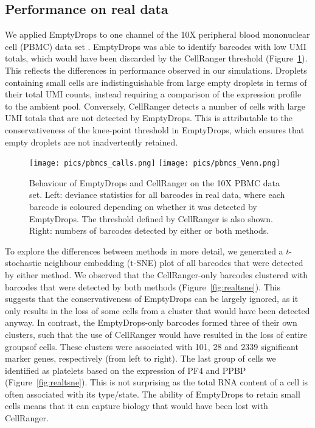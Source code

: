 \documentclass[10pt,letterpaper]{article}
\begin{document}
\subsection*{Performance on real data}
We applied EmptyDrops to one channel of the 10X peripheral blood mononuclear cell (PBMC) data set \cite{zheng2017massively}.
EmptyDrops was able to identify barcodes with low UMI totals, which would have been discarded by the CellRanger threshold (Figure~\ref{fig:realcall}). 
This reflects the differences in performance observed in our simulations.
Droplets containing small cells are indistinguishable from large empty droplets in terms of their total UMI counts, instead requiring a comparison of the expression profile to the ambient pool.
Conversely, CellRanger detects a number of cells with large UMI totals that are not detected by EmptyDrops.
This is attributable to the conservativeness of the knee-point threshold in EmptyDrops, which ensures that empty droplets are not inadvertently retained.

\begin{figure}[bt]
    \begin{center}
        \texttt{[image: pics/pbmcs\_calls.png]}
        \texttt{[image: pics/pbmcs\_Venn.png]}
    \end{center}
    \caption{Behaviour of EmptyDrops and CellRanger on the 10X PBMC data set.
        Left: deviance statistics for all barcodes in real data, where each barcode is coloured depending on whether it was detected by EmptyDrops.
        The threshold defined by CellRanger is also shown.
        Right: numbers of barcodes detected by either or both methods.
    }
    \label{fig:realcall}
\end{figure}

To explore the differences between methods in more detail, we generated a $t$-stochastic neighbour embedding (t-SNE) plot \cite{van2008visualizing} of all barcodes that were detected by either method.
We observed that the CellRanger-only barcodes clustered with barcodes that were detected by both methods (Figure~\ref{fig:realtsne}).
This suggests that the conservativeness of EmptyDrops can be largely ignored, as it only results in the loss of some cells from a cluster that would have been detected anyway.
In contrast, the EmptyDrops-only barcodes formed three of their own clusters, such that the use of CellRanger would have resulted in the loss of entire groupsof cells. 
These clusters were associated with 101, 28 and 2339 significant marker genes, respectively (from left to right). 
The last group of cells we identified as platelets based on the expression of PF4 and PPBP (Figure~\ref{fig:realtsne}). 
This is not surprising as the total RNA content of a cell is often associated with its type/state.
The ability of EmptyDrops to retain small cells means that it can capture biology that would have been lost with CellRanger.
\end{document}
